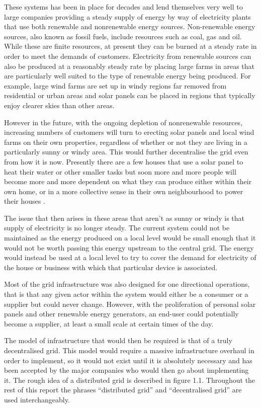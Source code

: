 \documentclass[a4paper, notitlepage]{report}
\begin{document}
These systems has been in place for decades and lend themselves very well to large
companies providing a steady supply of energy by way of electricity plants
that use both renewable and nonrenewable energy sources. Non-renewable energy
sources, also known as fossil fuels, include resources such as coal, gas and
oil. While these are finite resources, at present they can be burned at a steady
rate in order to meet the demands of customers. Electricity from renewable
sources can also be produced at a reasonably steady rate by placing large farms
in areas that are particularly well suited to the type of renewable energy being
produced. For example, large wind farms are set up in windy regions far removed
from residential or urban areas and solar panels can be placed in regions that
typically enjoy clearer skies than other areas.

However in the future, with the ongoing depletion of nonrenewable resources,
increasing numbers of customers will turn to erecting solar panels and local
wind farms on their own properties, regardless of whether or not they are
living in a particularly sunny or windy area. This would further decentralise
the grid even from how it is now. Presently there are a few houses
that use a solar panel to heat their water or other smaller tasks but soon more
and more people will become more and more dependent on what they can produce
either within their own home, or in a more collective sense in their own
neighbourhood to power their houses \cite{apergis2010renewable}.

The issue that then arises in these areas that aren’t as sunny or windy is that
supply of electricity is no longer steady. The current system could not be
maintained as the energy produced on a local level would be small enough that it
would not be worth passing this energy upstream to the central grid. The energy
would instead be used at a local level to try to cover the demand for
electricity of the house or business with which that particular device is
associated.

Most of the grid infrastructure was also designed for one directional
operations, that is that any given actor within the system would either be a
consumer or a supplier but could never change. However, with the proliferation
of personal solar panels and other renewable energy generators, an end-user
could potentially become a supplier, at least a small scale at certain times of
the day.

The model of infrastructure that would then be required is that of a truly
decentralised grid. This model would require a massive infrastructure overhaul
in order to implement, so it would not exist until it is absolutely necessary
and has been accepted by the major companies who would then go about
implementing it. The rough idea of a distributed grid is described in figure
1.1. Throughout the rest of this report the phrases “distributed grid” and
“decentralised grid” are used interchangeably.
\end{document}
